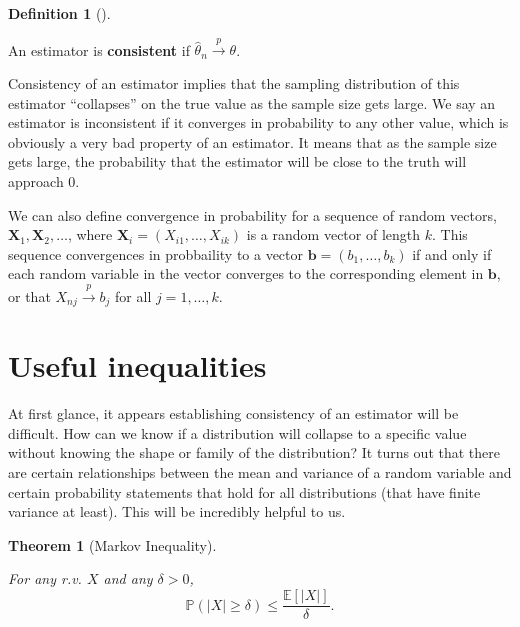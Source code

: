 \documentclass[
  letterpaper,
  DIV=11,
  numbers=noendperiod]{scrreprt}
\newcommand{\mb}{\symbf}
\newcommand{\E}{\mathbb{E}}
\renewcommand{\P}{\mathbb{P}}
\newcommand{\X}{\mb{X}}
\newcommand{\inprob}{\overset{p}{\to}}
\theoremstyle{definition}
\newtheorem{definition}{Definition}[chapter]
\theoremstyle{plain}
\newtheorem{theorem}{Theorem}[chapter]
\theoremstyle{definition}
\theoremstyle{remark}
\begin{document}
\leavevmode{}%
\begin{definition}[]\label{def-consistency}

An estimator is \textbf{consistent} if
\(\widehat{\theta}_n \inprob \theta\).

\end{definition}

Consistency of an estimator implies that the sampling distribution of
this estimator ``collapses'' on the true value as the sample size gets
large. We say an estimator is inconsistent if it converges in
probability to any other value, which is obviously a very bad property
of an estimator. It means that as the sample size gets large, the
probability that the estimator will be close to the truth will approach
0.

We can also define convergence in probability for a sequence of random
vectors, \(\X_1, \X_2, \ldots\), where
\(\X_i = (X_{i1}, \ldots, X_{ik})\) is a random vector of length \(k\).
This sequence convergences in probbaility to a vector
\(\mb{b} = (b_1, \ldots, b_k)\) if and only if each random variable in
the vector converges to the corresponding element in \(\mb{b}\), or that
\(X_{nj} \inprob b_j\) for all \(j = 1, \ldots, k\).

\hypertarget{useful-inequalities}{%
\section{Useful inequalities}\label{useful-inequalities}}

At first glance, it appears establishing consistency of an estimator
will be difficult. How can we know if a distribution will collapse to a
specific value without knowing the shape or family of the distribution?
It turns out that there are certain relationships between the mean and
variance of a random variable and certain probability statements that
hold for all distributions (that have finite variance at least). This
will be incredibly helpful to us.

\leavevmode{}%
\begin{theorem}[Markov Inequality]\label{thm-markov}

For any r.v. \(X\) and any \(\delta >0\), \[
\P(|X| \geq \delta) \leq \frac{\E[|X|]}{\delta}.
\]

\end{theorem}
\end{document}
